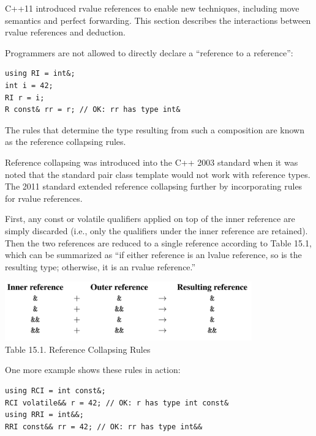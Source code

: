 

C++11 introduced rvalue references to enable new techniques, including move semantics and perfect forwarding. This section describes the interactions between rvalue references and deduction.


Programmers are not allowed to directly declare a “reference to a reference”:

\begin{lstlisting}[style=styleCXX]
using RI = int&;
int i = 42;
RI r = i;
R const& rr = r; // OK: rr has type int&
\end{lstlisting}

The rules that determine the type resulting from such a composition are known as the reference collapsing rules.

\begin{tcolorbox}[colback=webgreen!5!white,colframe=webgreen!75!black]
\hspace*{0.75cm}Reference collapsing was introduced into the C++ 2003 standard when it was noted that the standard pair class template would not work with reference types. The 2011 standard extended reference collapsing further by incorporating rules for rvalue references.
\end{tcolorbox}

First, any const or volatile qualifiers applied on top of the inner reference are simply discarded (i.e., only the qualifiers under the inner reference are retained). Then the two references are reduced to a single reference according to Table 15.1, which can be summarized as “if either reference is an lvalue reference, so is the resulting type; otherwise, it is an rvalue reference.”

\begin{center}
\includegraphics[width=0.8\textwidth]{content/2/chapter15/images/1.png} \\
Table 15.1. Reference Collapsing Rules
\end{center}

One more example shows these rules in action:

\begin{lstlisting}[style=styleCXX]
using RCI = int const&;
RCI volatile&& r = 42; // OK: r has type int const&
using RRI = int&&;
RRI const&& rr = 42; // OK: rr has type int&&
\end{lstlisting}


